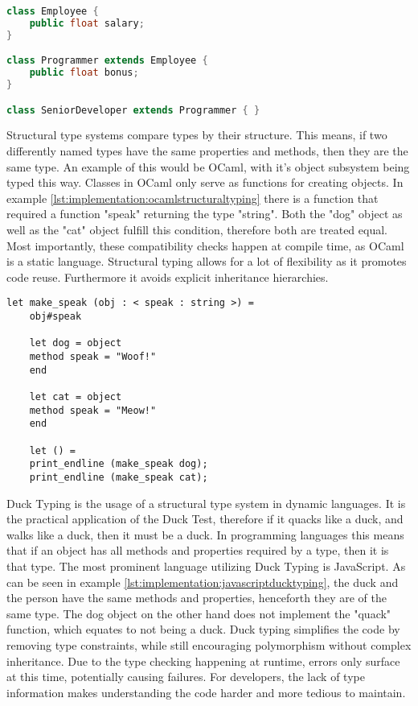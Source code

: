 \begin{lstlisting}[language=Java,caption=Example of nominal typing in java,label=lst:implementation:javanominaltyping]
class Employee {
	public float salary;
}

class Programmer extends Employee {
	public float bonus;
}

class SeniorDeveloper extends Programmer { }
\end{lstlisting}


Structural type systems compare types by their structure. This means, if two differently named types have the same properties and methods, then they are the same type. An example of this would be OCaml, with it's object subsystem being typed this way. Classes in OCaml only serve as functions for creating objects. In example \ref{lst:implementation:ocamlstructuraltyping} there is a function that required a function "speak" returning the type "string". Both the "dog" object as well as the "cat" object fulfill this condition, therefore both are treated equal. Most importantly, these compatibility checks happen at compile time, as OCaml is a static language. Structural typing allows for a lot of flexibility as it promotes code reuse. Furthermore it avoids explicit inheritance hierarchies.

\begin{lstlisting}[language=caml,caption=Example of structural typing in Ocaml,label=lst:implementation:ocamlstructuraltyping]
	let make_speak (obj : < speak : string >) =
	obj#speak
	
	let dog = object
	method speak = "Woof!"
	end
	
	let cat = object
	method speak = "Meow!"
	end
	
	let () =
	print_endline (make_speak dog);
	print_endline (make_speak cat);
\end{lstlisting}

Duck Typing is the usage of a structural type system in dynamic languages. It is the practical application of the Duck Test, therefore if it quacks like a duck, and walks like a duck, then it must be a duck. In programming languages this means that if an object has all methods and properties required by a type, then it is that type. The most prominent language utilizing Duck Typing is JavaScript. As can be seen in example \ref{lst:implementation:javascriptducktyping}, the duck and the person have the same methods and properties, henceforth they are of the same type. The dog object on the other hand does not implement the "quack" function, which equates to not  being a duck. Duck typing simplifies the code by removing type constraints, while still encouraging polymorphism without complex inheritance. Due to the type checking happening at runtime, errors only surface at this time, potentially causing failures. For developers, the lack of type information makes understanding the code harder and more tedious to maintain.

